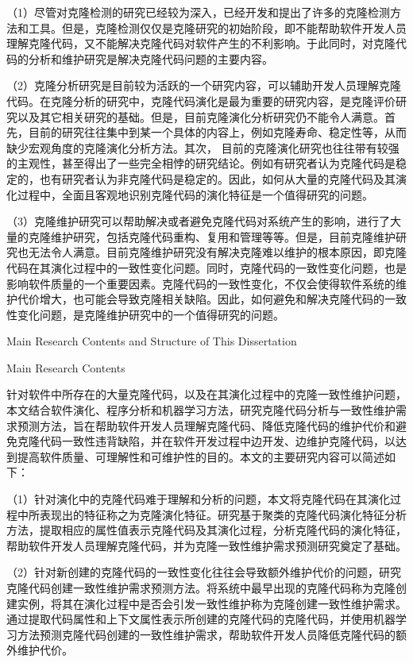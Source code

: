 （1）尽管对克隆检测的研究已经较为深入，已经开发和提出了许多的克隆检测方法和工具。但是，克隆检测仅仅是克隆研究的初始阶段，即不能帮助软件开发人员理解克隆代码，又不能解决克隆代码对软件产生的不利影响。于此同时，对克隆代码的分析和维护研究是解决克隆代码问题的主要内容。

（2）克隆分析研究是目前较为活跃的一个研究内容，可以辅助开发人员理解克隆代码。在克隆分析的研究中，克隆代码演化是最为重要的研究内容，是克隆评价研究以及其它相关研究的基础。但是，目前克隆演化分析研究仍不能令人满意。首先，目前的研究往往集中到某一个具体的内容上，例如克隆寿命、稳定性等，从而缺少宏观角度的克隆演化分析方法。其次， 目前的克隆演化研究也往往带有较强的主观性，甚至得出了一些完全相悖的研究结论。例如有研究者认为克隆代码是稳定的，也有研究者认为非克隆代码是稳定的。因此，如何从大量的克隆代码及其演化过程中，全面且客观地识别克隆代码的演化特征是一个值得研究的问题。

（3）克隆维护研究可以帮助解决或者避免克隆代码对系统产生的影响，进行了大量的克隆维护研究，包括克隆代码重构、复用和管理等等。但是，目前克隆维护研究也无法令人满意。目前克隆维护研究没有解决克隆难以维护的根本原因，即克隆代码在其演化过程中的一致性变化问题。同时，克隆代码的一致性变化问题，也是影响软件质量的一个重要因素。克隆代码的一致性变化，不仅会使得软件系统的维护代价增大，也可能会导致克隆相关缺陷。因此，如何避免和解决克隆代码的一致性变化问题，是克隆维护研究中的一个值得研究的问题。

{Main Research Contents and Structure of This Dissertation}

{Main Research Contents}

针对软件中所存在的大量克隆代码，以及在其演化过程中的克隆一致性维护问题，本文结合软件演化、程序分析和机器学习方法，研究克隆代码分析与一致性维护需求预测方法，旨在帮助软件开发人员理解克隆代码、降低克隆代码的维护代价和避免克隆代码一致性违背缺陷，并在软件开发过程中边开发、边维护克隆代码，以达到提高软件质量、可理解性和可维护性的目的。本文的主要研究内容可以简述如下：

（1）针对演化中的克隆代码难于理解和分析的问题，本文将克隆代码在其演化过程中所表现出的特征称之为克隆演化特征。研究基于聚类的克隆代码演化特征分析方法，提取相应的属性值表示克隆代码及其演化过程，分析克隆代码的演化特征，帮助软件开发人员理解克隆代码，并为克隆一致性维护需求预测研究奠定了基础。

（2）针对新创建的克隆代码的一致性变化往往会导致额外维护代价的问题，研究克隆代码创建一致性维护需求预测方法。将系统中最早出现的克隆代码称为克隆创建实例，将其在演化过程中是否会引发一致性维护称为克隆创建一致性维护需求。通过提取代码属性和上下文属性表示所创建的克隆代码的克隆代码，并使用机器学习方法预测克隆代码创建的一致性维护需求，帮助软件开发人员降低克隆代码的额外维护代价。

